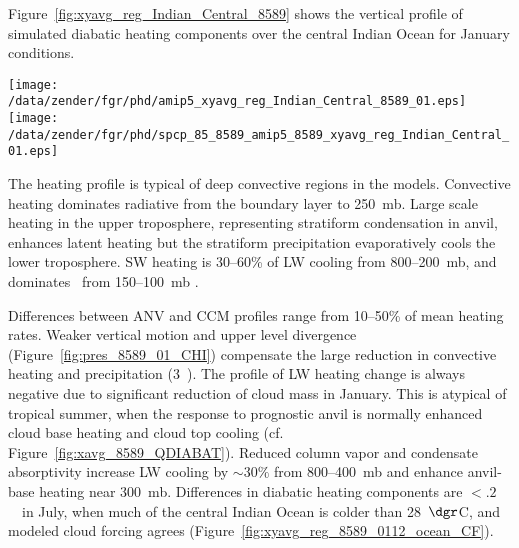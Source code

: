 \documentclass[agums]{aguplus}
\begin{document}
Figure~\ref{fig:xyavg_reg_Indian_Central_8589} shows
the vertical profile of simulated diabatic heating components over 
the central Indian Ocean for January conditions.
\begin{figure*}
\begin{center}
\texttt{[image: /data/zender/fgr/phd/amip5\_xyavg\_reg\_Indian\_Central\_8589\_01.eps]}%
\texttt{[image: /data/zender/fgr/phd/spcp\_85\_8589\_amip5\_8589\_xyavg\_reg\_Indian\_Central\_01.eps]}%
\end{center}
\caption[Model simulated profiles of diabatic heating
and differences between models (ANV$-$CCM) over the central 
Indian Ocean for 1985--1989 January]{
Model simulated profiles of (a) diabatic heating
(\kxday), and (b) differences between models (ANV$-$CCM) for the
central Indian Ocean (15~\dgr S--5~\dgr N, 60--80~\dgr E) 
for 1985--1989 January.
Heatings shown are total diabatic (solid), shortwave (dotted),
longwave (short dash), resolved (dash-dot), turbulent
(dash-dot-dot-dot), and convective (long dash).
Note difference in scales.
\label{fig:xyavg_reg_Indian_Central_8589}}
\end{figure*}
The heating profile is typical of deep convective regions in the
models.
Convective heating dominates radiative from the boundary layer to
250~mb. 
Large scale heating in the upper troposphere, representing stratiform
condensation in anvil, enhances latent heating but the stratiform
precipitation evaporatively cools the lower troposphere.
SW heating is 30--60\% of LW cooling from 800--200~mb, and dominates
\QT\ from 150--100~mb \cite[]{RaR891}. 

Differences between ANV and CCM profiles range from 10--50\% of mean
heating rates.
Weaker vertical motion and upper level divergence
(Figure~\ref{fig:pres_8589_01_CHI}) compensate the large reduction
in convective heating and precipitation (3~\mmxday).
The profile of LW heating change is always negative due to significant
reduction of cloud mass in January.
This is atypical of tropical summer, when the response to prognostic
anvil is normally enhanced cloud base heating and cloud top cooling
(cf. Figure~\ref{fig:xavg_8589_QDIABAT}).
Reduced column vapor and condensate absorptivity increase LW cooling 
by $\sim 30\%$ from 800--400~mb and enhance anvil-base heating near
300~mb. 
Differences in diabatic heating components are $< .2$~\kxday\ in July,
when much of the central Indian Ocean is colder than 28~$\dgr$C, 
and modeled cloud forcing agrees
(Figure~\ref{fig:xyavg_reg_8589_0112_ocean_CF}).  
\end{document}
